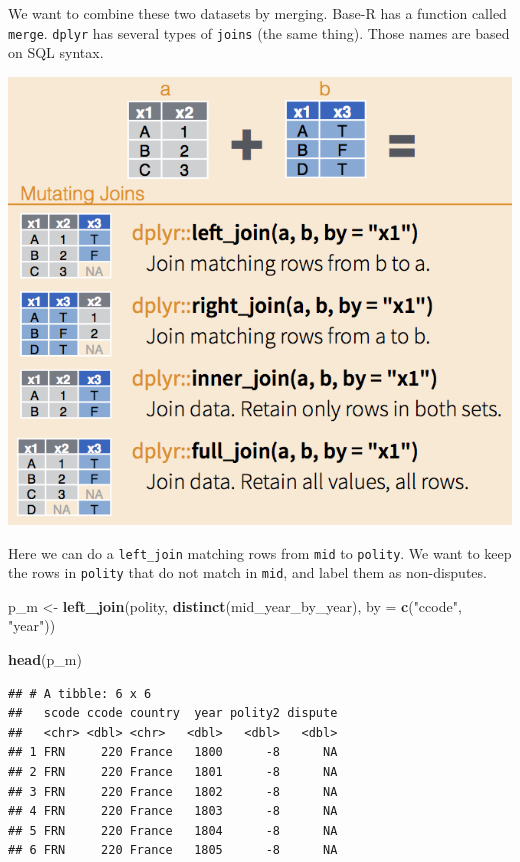 \documentclass[]{book}
\newenvironment{Shaded}{\begin{snugshade}}{\end{snugshade}}
\newcommand{\DataTypeTok}[1]{\textcolor[rgb]{0.13,0.29,0.53}{#1}}
\newcommand{\KeywordTok}[1]{\textcolor[rgb]{0.13,0.29,0.53}{\textbf{#1}}}
\newcommand{\NormalTok}[1]{#1}
\newcommand{\StringTok}[1]{\textcolor[rgb]{0.31,0.60,0.02}{#1}}
\theoremstyle{definition}
\theoremstyle{definition}
\theoremstyle{definition}
\theoremstyle{remark}
\begin{document}
We want to combine these two datasets by merging. Base-R has a function called \texttt{merge}. \texttt{dplyr} has several types of \texttt{joins} (the same thing). Those names are based on SQL syntax.

\includegraphics{images/dplyr-joins.png}

Here we can do a \texttt{left\_join} matching rows from \texttt{mid} to \texttt{polity}. We want to keep the rows in \texttt{polity} that do not match in \texttt{mid}, and label them as non-disputes.

\begin{Shaded}
\begin{Highlighting}[]
\NormalTok{p_m <-}\StringTok{ }\KeywordTok{left_join}\NormalTok{(polity,}
                 \KeywordTok{distinct}\NormalTok{(mid_year_by_year),}
                 \DataTypeTok{by =} \KeywordTok{c}\NormalTok{(}\StringTok{"ccode"}\NormalTok{, }\StringTok{"year"}\NormalTok{))}

\KeywordTok{head}\NormalTok{(p_m)}
\end{Highlighting}
\end{Shaded}

\begin{verbatim}
## # A tibble: 6 x 6
##   scode ccode country  year polity2 dispute
##   <chr> <dbl> <chr>   <dbl>   <dbl>   <dbl>
## 1 FRN     220 France   1800      -8      NA
## 2 FRN     220 France   1801      -8      NA
## 3 FRN     220 France   1802      -8      NA
## 4 FRN     220 France   1803      -8      NA
## 5 FRN     220 France   1804      -8      NA
## 6 FRN     220 France   1805      -8      NA
\end{verbatim}
\end{document}
